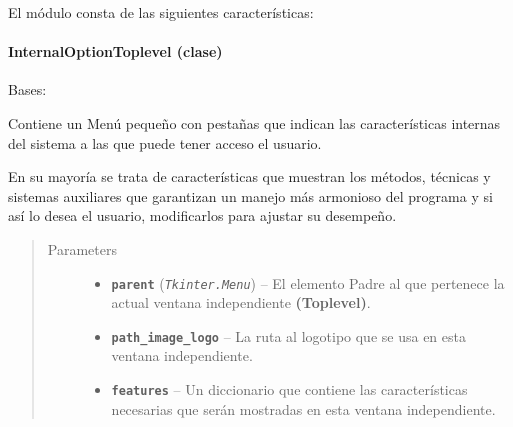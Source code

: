 \documentclass[letterpaper,10pt,english]{sphinxmanual}
\begin{document}
El módulo consta de las siguientes características:


\paragraph{InternalOptionToplevel (clase)}
\label{View/Additional/MenuInternalOption/InternalOptionToplevel:internaloptiontoplevel-clase}\label{View/Additional/MenuInternalOption/InternalOptionToplevel::doc}\label{View/Additional/MenuInternalOption/InternalOptionToplevel:module-View.Additional.MenuInternalOption.InternalOptionToplevel}

\begin{fulllineitems}
\label{View/Additional/MenuInternalOption/InternalOptionToplevel:View.Additional.MenuInternalOption.InternalOptionToplevel.InternalOptionToplevel}
Bases: 

\begin{DUlineblock}{0em}
\item[] Contiene un Menú pequeño con pestañas que indican las
características internas del sistema a las que puede tener acceso el 
usuario.
\item[] En su mayoría se trata de características que muestran los métodos,
técnicas y sistemas auxiliares que garantizan un manejo más armonioso 
del programa y si así lo desea el usuario, modificarlos para ajustar
su desempeño.
\end{DUlineblock}
\begin{quote}\begin{description}
\item[{Parameters}] \leavevmode\begin{itemize}
\item {} 
\textbf{\texttt{parent}} (\emph{\texttt{Tkinter.Menu}}) -- El elemento Padre al que pertenece la actual
ventana independiente \textbf{(Toplevel)}.

\item {} 
\textbf{\texttt{path\_image\_logo}} -- La ruta al logotipo que se usa en esta ventana 
independiente.

\item {} 
\textbf{\texttt{features}} -- Un diccionario que contiene las características necesarias
que serán mostradas en esta ventana independiente.


\end{itemize}
\end{description}
\end{quote}
\end{fulllineitems}
\end{document}
